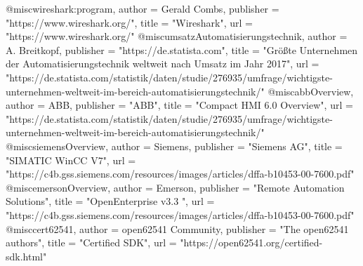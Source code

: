 @misc{wireshark:program,
  author = {Gerald Combs},
  publisher = "https://www.wireshark.org/",
  title = "Wireshark",
  url = "https://www.wireshark.org/"
}
@misc{umsatzAutomatisierungstechnik,
  author = {A. Breitkopf},
  publisher = "https://de.statista.com",
  title = "Größte Unternehmen der Automatisierungstechnik weltweit nach Umsatz im Jahr 2017",
  url = "https://de.statista.com/statistik/daten/studie/276935/umfrage/wichtigste-unternehmen-weltweit-im-bereich-automatisierungstechnik/"
}
@misc{abbOverview,
  author = {ABB},
  publisher = "ABB",
  title = "Compact HMI 6.0 Overview",
  url = "https://de.statista.com/statistik/daten/studie/276935/umfrage/wichtigste-unternehmen-weltweit-im-bereich-automatisierungstechnik/"
}
@misc{siemensOverview,
  author = {Siemens},
  publisher = "Siemens AG",
  title = "SIMATIC WinCC V7",
  url = "https://c4b.gss.siemens.com/resources/images/articles/dffa-b10453-00-7600.pdf"
}
@misc{emersonOverview,
  author = {Emerson},
  publisher = "Remote Automation Solutions",
  title = "OpenEnterprise v3.3 ",
  url = "https://c4b.gss.siemens.com/resources/images/articles/dffa-b10453-00-7600.pdf"
}
@misc{cert62541,
  author = {open62541 Community},
  publisher = "The open62541 authors",
  title = "Certified SDK",
  url = "https://open62541.org/certified-sdk.html"
}
